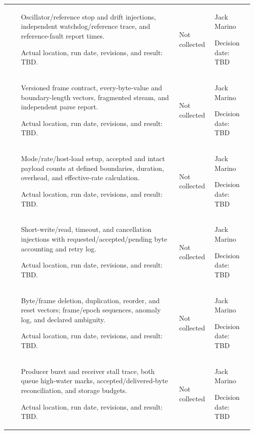 \begin{landscape}
\begin{tabularx}{\linewidth}{L{2.0cm}L{3.3cm}Y L{2.3cm}L{2.6cm}}
 & \par {} & Oscillator/reference stop and drift injections, independent watchdog/reference trace, and reference-fault report times.\par Actual location, run date, revisions, and result: TBD. & Not collected & Jack Marino\par Decision date: TBD\\
 & \par {} & Versioned frame contract, every-byte-value and boundary-length vectors, fragmented stream, and independent parse report.\par Actual location, run date, revisions, and result: TBD. & Not collected & Jack Marino\par Decision date: TBD\\
 & \par {} & Mode/rate/host-load setup, accepted and intact payload counts at defined boundaries, duration, overhead, and effective-rate calculation.\par Actual location, run date, revisions, and result: TBD. & Not collected & Jack Marino\par Decision date: TBD\\
 & \par {} & Short-write/read, timeout, and cancellation injections with requested/accepted/pending byte accounting and retry log.\par Actual location, run date, revisions, and result: TBD. & Not collected & Jack Marino\par Decision date: TBD\\
 & \par {} & Byte/frame deletion, duplication, reorder, and reset vectors; frame/epoch sequences, anomaly log, and declared ambiguity.\par Actual location, run date, revisions, and result: TBD. & Not collected & Jack Marino\par Decision date: TBD\\
 & \par {} & Producer burst and receiver stall trace, both queue high-water marks, accepted/delivered-byte reconciliation, and storage budgets.\par Actual location, run date, revisions, and result: TBD. & Not collected & Jack Marino\par Decision date: TBD\\

\end{tabularx}
\end{landscape}
